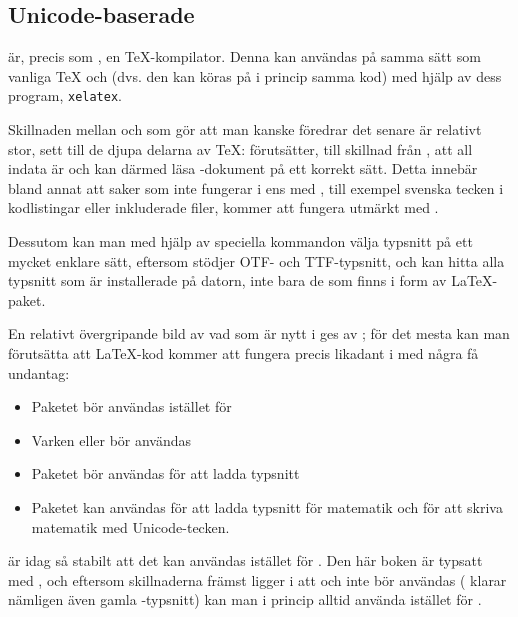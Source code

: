 \documentclass[10pt,../../a4.tex]{subfiles}
\begin{document}
\subsection{Unicode-baserade \XeTeX}
\XeTeX är, precis som \pdfLaTeX, en \TeX-kompilator. Denna kan användas
på samma sätt som vanliga \TeX{} och \pdfLaTeX (dvs. den kan köras på i
princip samma kod) med hjälp av dess program, \texttt{xelatex}.

Skillnaden mellan \pdfLaTeX{} och \XeTeX som gör att man kanske föredrar
det senare är relativt stor, sett till de djupa delarna av \TeX: \XeTeX 
förutsätter, till skillnad från \pdfLaTeX, att all indata är \UTF och kan
därmed läsa \UTF-dokument på ett korrekt sätt. Detta innebär bland annat
att saker som inte fungerar i \pdfLaTeX ens med , till
exempel svenska tecken i kodlistingar eller inkluderade filer, kommer att
fungera utmärkt med \XeTeX.

Dessutom kan man med hjälp av speciella kommandon välja typsnitt på ett
mycket enklare sätt, eftersom \XeTeX stödjer \textsc{OTF}- och
\textsc{TTF}-typsnitt, och kan hitta alla typsnitt som är installerade
på datorn, inte bara de som finns i form av \LaTeX-paket.

En relativt övergripande bild av vad som är nytt i \XeTeX ges av
\textcite{Robertson11}; för det mesta kan man förutsätta att \LaTeX-kod
kommer att fungera precis likadant i \XeTeX med några få undantag:
\begin{itemize}
	\item Paketet  bör användas istället för 
	\item Varken  eller  bör användas
	\item Paketet  bör användas för att ladda typsnitt
	\item Paketet  kan användas för att ladda typsnitt
		  för matematik och för att skriva matematik med Unicode-tecken.
\end{itemize}

\XeTeX är idag så stabilt att det kan användas istället för \pdfLaTeX.
Den här boken är typsatt med \XeTeX, och eftersom skillnaderna främst
ligger i att  och  inte bör användas (\XeTeX
klarar nämligen även gamla \pdfLaTeX-typsnitt) kan man i princip alltid
använda \XeTeX istället för \pdfLaTeX.
\end{document}
